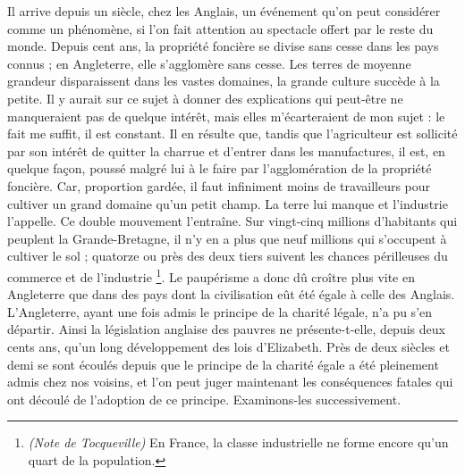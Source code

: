 \documentclass[french,twoside]{book} %
\begin{document}
Il arrive depuis un siècle, chez les Anglais, un événement qu’on peut considérer comme un phénomène, si l’on fait attention au spectacle offert par le reste du monde. Depuis cent ans, la propriété foncière se divise sans cesse dans les pays connus ; en Angleterre, elle s’agglomère sans cesse. Les terres de moyenne grandeur disparaissent dans les vastes domaines, la grande culture succède à la petite. Il y aurait sur ce sujet à donner des explications qui peut-être ne manqueraient pas de quelque intérêt, mais elles m’écarteraient de mon sujet : le fait me suffit, il est constant. Il en résulte que, tandis que l’agriculteur est sollicité par son intérêt de quitter la charrue et d’entrer dans les manufactures, il est, en quelque façon, poussé malgré lui à le faire par l’agglomération de la propriété foncière. Car, proportion gardée, il faut infiniment moins de travailleurs pour cultiver un grand domaine qu’un petit champ. La terre lui manque et l’industrie l’appelle. Ce double mouvement l’entraîne. Sur vingt-cinq millions d’habitants qui peuplent la Grande-Bretagne, il n’y en a plus que neuf millions qui s’occupent à cultiver le sol ; quatorze ou près des deux tiers suivent les chances périlleuses du commerce et de l’industrie \footnote{\emph{(Note de Tocqueville)} En France, la classe industrielle ne forme encore qu’un quart de la population. }. Le paupérisme a donc dû croître plus vite en Angleterre que dans des pays dont la civilisation eût été égale à celle des Anglais. L'Angleterre, ayant une fois admis le principe de la charité légale, n’a pu s’en départir. Ainsi la législation anglaise des pauvres ne présente-t-elle, depuis deux cents ans, qu’un long développement des lois d’Elizabeth. Près de deux siècles et demi se sont écoulés depuis que le principe de la charité égale a été pleinement admis chez nos voisins, et l’on peut juger maintenant les conséquences fatales qui ont découlé de l’adoption de ce principe. Examinons-les successivement.\par
\end{document}

